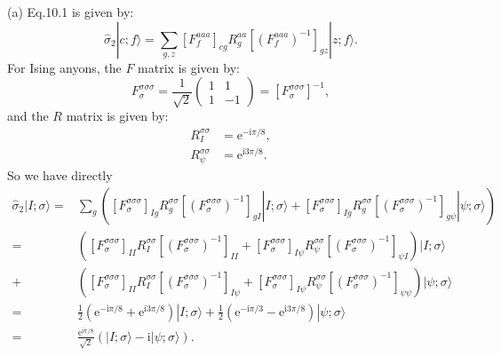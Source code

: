 \documentclass{book}
\begin{document}
(a) Eq.10.1 is given by:
\begin{equation*}
\hat{\sigma }_{2} |c;f\rangle =\sum _{g,z} [F_{f}^{aaa} ]_{cg} R_{g}^{aa} [(F_{f}^{aaa} )^{-1} ]_{gz} |z;f\rangle .
\end{equation*}
For Ising anyons, the $F$ matrix is given by:
\begin{equation*}
F_{\sigma }^{\sigma \sigma \sigma } =\frac{1}{\sqrt{2}}\begin{pmatrix}
1 & 1\\
1 & -1
\end{pmatrix} =[F_{\sigma }^{\sigma \sigma \sigma } ]^{-1} ,
\end{equation*}
and the $R$ matrix is given by:
\begin{equation*}
\begin{aligned}
R_{I}^{\sigma \sigma } & =\mathrm{e}^{-\mathrm{i} \pi /8} ,\\
R_{\psi }^{\sigma \sigma } & =\mathrm{e}^{\mathrm{i} 3\pi /8} .
\end{aligned}
\end{equation*}
So we have directly
\begin{equation*}
\begin{aligned}
\hat{\sigma }_{2} |I;\sigma \rangle = & \sum _{g} ([F_{\sigma }^{\sigma \sigma \sigma } ]_{Ig} R_{g}^{\sigma \sigma } [(F_{\sigma }^{\sigma \sigma \sigma } )^{-1} ]_{gI} |I;\sigma \rangle +[F_{\sigma }^{\sigma \sigma \sigma } ]_{Ig} R_{g}^{\sigma \sigma } [(F_{\sigma }^{\sigma \sigma \sigma } )^{-1} ]_{g\psi } |\psi ;\sigma \rangle )\\
= & ([F_{\sigma }^{\sigma \sigma \sigma } ]_{II} R_{I}^{\sigma \sigma } [(F_{\sigma }^{\sigma \sigma \sigma } )^{-1} ]_{II} +[F_{\sigma }^{\sigma \sigma \sigma } ]_{I\psi } R_{\psi }^{\sigma \sigma } [(F_{\sigma }^{\sigma \sigma \sigma } )^{-1} ]_{\psi I} )|I;\sigma \rangle \\
+ & ([F_{\sigma }^{\sigma \sigma \sigma } ]_{II} R_{I}^{\sigma \sigma } [(F_{\sigma }^{\sigma \sigma \sigma } )^{-1} ]_{I\psi } +[F_{\sigma }^{\sigma \sigma \sigma } ]_{I\psi } R_{\psi }^{\sigma \sigma } [(F_{\sigma }^{\sigma \sigma \sigma } )^{-1} ]_{\psi \psi } )|\psi ;\sigma \rangle \\
= & \frac{1}{2} (\mathrm{e}^{-\mathrm{i} \pi /8} +\mathrm{e}^{\mathrm{i} 3\pi /8} )|I;\sigma \rangle +\frac{1}{2} (\mathrm{e}^{-\mathrm{i} \pi /3} -\mathrm{e}^{\mathrm{i} 3\pi /8} )|\psi ;\sigma \rangle \\
= & \frac{\mathrm{e}^{\mathrm{i} \pi /8}}{\sqrt{2}} (|I;\sigma \rangle -\mathrm{i} |\psi ;\sigma \rangle ).
\end{aligned}
\end{equation*}
\end{document}

